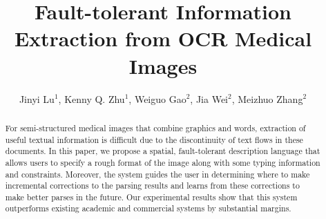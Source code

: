 \documentclass[sigconf, review]{acmart}
\begin{document}
\title{Fault-tolerant Information Extraction from OCR Medical Images
}
\author{Jinyi Lu$^1$, Kenny Q. Zhu$^1$, Weiguo Gao$^2$, Jia Wei$^2$, Meizhuo Zhang$^2$}


\renewcommand{\shortauthors}{J. Lu et al.}


\begin{abstract}
	For semi-structured medical images that combine graphics and words,
	extraction of useful textual information is difficult
	due to the discontinuity of text flows in these documents. 
In this paper, we propose a spatial, fault-tolerant description language that allows users to 
	specify a rough format of the image along with some typing information and
	constraints. 
	Moreover, the system guides
	the user in determining where to make incremental corrections to 
	the parsing results and learns from these corrections to make better 
	parses in the future. Our experimental results show
	that this system outperforms existing academic and commercial systems by
	substantial margins. 
\end{abstract}

\maketitle







%
%
%


\end{document}
